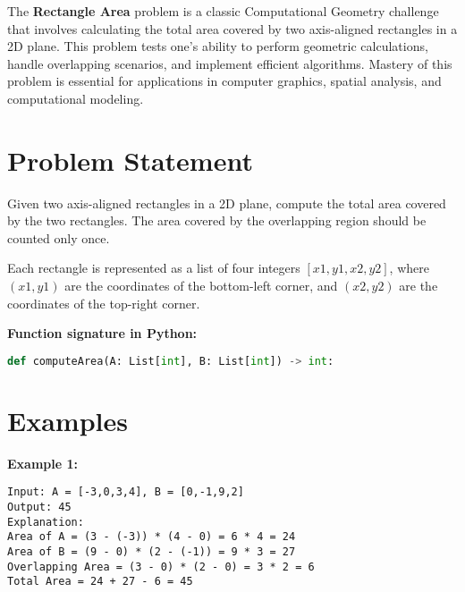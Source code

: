 
\label{chap:Rectangle_Area}

The \textbf{Rectangle Area} problem is a classic Computational Geometry challenge that involves calculating the total area covered by two axis-aligned rectangles in a 2D plane. This problem tests one's ability to perform geometric calculations, handle overlapping scenarios, and implement efficient algorithms. Mastery of this problem is essential for applications in computer graphics, spatial analysis, and computational modeling.

\section*{Problem Statement}

Given two axis-aligned rectangles in a 2D plane, compute the total area covered by the two rectangles. The area covered by the overlapping region should be counted only once.

Each rectangle is represented as a list of four integers \([x1, y1, x2, y2]\), where \((x1, y1)\) are the coordinates of the bottom-left corner, and \((x2, y2)\) are the coordinates of the top-right corner.

\textbf{Function signature in Python:}
\begin{lstlisting}[language=Python]
def computeArea(A: List[int], B: List[int]) -> int:
\end{lstlisting}

\section*{Examples}

\textbf{Example 1:}

\begin{verbatim}
Input: A = [-3,0,3,4], B = [0,-1,9,2]
Output: 45
Explanation:
Area of A = (3 - (-3)) * (4 - 0) = 6 * 4 = 24
Area of B = (9 - 0) * (2 - (-1)) = 9 * 3 = 27
Overlapping Area = (3 - 0) * (2 - 0) = 3 * 2 = 6
Total Area = 24 + 27 - 6 = 45
\end{verbatim}

